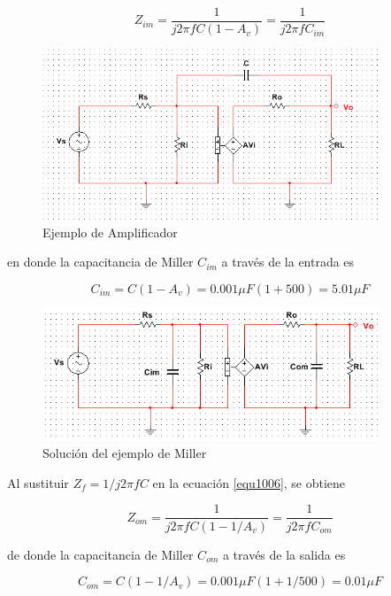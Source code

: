 \documentclass[12pt]{book}
\theoremstyle{definition}
\theoremstyle{remark}
\theoremstyle{plain}
\begin{document}
\begin{equation}
Z_{im}=\frac{1}{j2 \pi f C (1-A_{v})}=\frac{1}{j 2 \pi f C_{im}}
\label{equ1008}
\end{equation}


\begin{figure}
\centering
\includegraphics[width=4in]{ejemploMiller.png}
\caption{Ejemplo de Amplificador}
\label{fig1002}
\end{figure}

en donde la capacitancia de Miller $C_{im}$ a través de la entrada es

\begin{equation}
C_{im}=C(1-A_{v})=0.001 \mu F (1+500)=5.01 \mu F
\label{equ1009}
\end{equation}

\begin{figure}
\centering
\includegraphics[width=4in]{SolucionEjemploMiller.png}
\caption{Solución del ejemplo de Miller}
\label{fig1003}
\end{figure}

Al sustituir $Z_{f}=1/j2 \pi f C$ en la ecuación \ref{equ1006}, se obtiene

\begin{equation}
Z_{om}=\frac{1}{j2 \pi f C (1-1/A_{v})}=\frac{1}{j 2 \pi f C_{om}}
\label{equ1010}
\end{equation}

de donde la capacitancia de Miller $C_{om}$ a través de la salida es

\begin{equation}
C_{om}=C(1-1/A_{v})=0.001 \mu F (1+1/500)=0.01 \mu F
\label{equ1011}
\end{equation}
\end{document}

